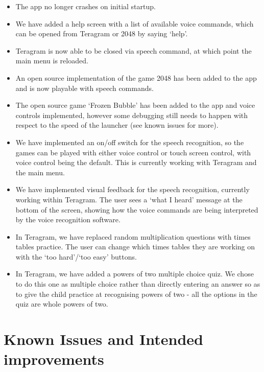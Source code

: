 \documentclass[11pt, oneside]{article}
\begin{document}
\begin{itemize}
\item The app no longer crashes on initial startup.
  \item We have added a help screen with a list of available voice commands, which can be opened from Teragram or 2048 by saying `help'.
	\item Teragram is now able to be closed via speech command, at
          which point the main menu is reloaded.
	\item An open source implementation of the game 2048 has been
          added to the app and is now playable with speech commands.
	\item The open source game `Frozen Bubble' has been added to
          the app and voice controls implemented, however some
          debugging still needs to happen with respect to the speed of
          the launcher (see known issues for more).
        \item We have implemented an on/off switch for the speech
          recognition, so the games can be played with either voice
          control or touch screen control, with voice control being
          the default. This is currently working with Teragram and the
          main menu.
        \item We have implemented visual feedback for the speech
          recognition, currently working within Teragram. The user
          sees a `what I heard' message at the bottom of the screen,
          showing how the voice commands are being interpreted by the
          voice recognition software.
        \item In Teragram, we have replaced random multiplication
          questions with times tables practice. The user can change
          which times tables they are working on with the `too
          hard'/`too easy' buttons.
        \item In Teragram, we have added a powers of two multiple
          choice quiz. We chose to do this one as multiple choice
          rather than directly entering an answer so as to give the
          child practice at recognising powers of two - all the
          options in the quiz are whole powers of two.
\end{itemize}

\pagebreak

\section{Known Issues and Intended improvements}
\end{document}
